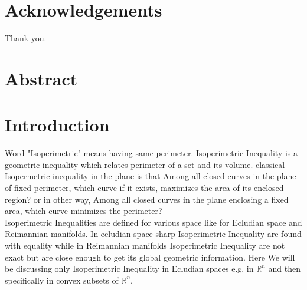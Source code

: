 \documentclass[oneside]{book}
\begin{document}
\chapter*{Acknowledgements}
Thank you.
\thispagestyle{empty}

\chapter*{Abstract}









































\chapter{Introduction}
\label{chap:c1}
 Word "Isoperimetric" means having same perimeter. Isoperimetric Inequality  is a geometric inequality which relates perimeter of a set and its volume. classical Isopermetric inequality in the plane is that Among all closed curves in the plane of fixed perimeter, which curve if it exists, maximizes the area of its enclosed region? or in other way, Among all closed curves in the plane enclosing a fixed area, which curve minimizes the perimeter?\\
Isoperimetric Inequalities are defined for various space like for Ecludian space and Reimannian manifolds. In ecludian space sharp Isoperimetric Inequality are found with equality while in Reimannian manifolds Isoperimetric Inequality are not exact but are close enough to get its global geometric information. Here We will be discussing only  Isoperimetric Inequality in Ecludian spaces e.g. in  $\mathbb{R}^{n}$ and then specifically in convex subsets of $\mathbb{R}^{n}$.
\\
\end{document}
